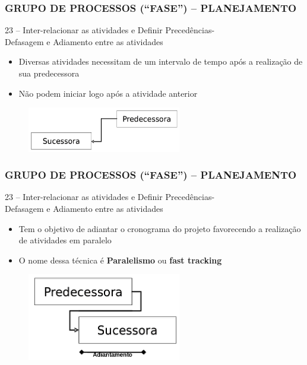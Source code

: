 \begin{frame}
 \frametitle{GRUPO DE PROCESSOS (“FASE”) – PLANEJAMENTO}
23 – Inter-relacionar as atividades e Definir Precedências-\\
Defasagem e Adiamento entre as atividades
  \begin{itemize}
   \item Diversas atividades necessitam de um intervalo de tempo após a realização de sua predecessora
   \item Não podem iniciar logo após a atividade anterior
  \end{itemize}
  \begin{figure}
   \centering
   \includegraphics[width = 0.6\textwidth]{figs/fig7.png}
  \end{figure}
\end{frame}

\begin{frame}
 \frametitle{GRUPO DE PROCESSOS (“FASE”) – PLANEJAMENTO}
23 – Inter-relacionar as atividades e Definir Precedências- \\
Defasagem e Adiamento entre as atividades
  \begin{itemize}
   \item Tem o objetivo de adiantar o cronograma do projeto favorecendo a realização de atividades em paralelo
    \item O nome dessa técnica é \textbf{Paralelismo} ou \textbf{fast tracking}
      \end{itemize}
  \begin{figure}
   \centering
   \includegraphics[width = 0.6\textwidth]{figs/fig9.png}
  \end{figure}
\end{frame}



